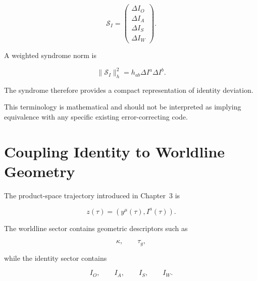 \documentclass[12pt,oneside]{book}
\begin{document}
\begin{equation}
    \mathcal{S}_I
    =
    \begin{pmatrix}
        \Delta I_O \\
        \Delta I_A \\
        \Delta I_S \\
        \Delta I_W
    \end{pmatrix}.
    \label{eq:identity-syndrome-vector}
\end{equation}

A weighted syndrome norm is

\begin{equation}
    \|\mathcal{S}_I\|_h^2
    =
    h_{ab}
    \Delta I^a
    \Delta I^b.
    \label{eq:identity-syndrome-norm}
\end{equation}

The syndrome therefore provides a compact representation of
identity deviation.

This terminology is mathematical and should not be interpreted
as implying equivalence with any specific existing
error-correcting code.


\section{Coupling Identity to Worldline Geometry}
\label{sec:identity-worldline-coupling}

The product-space trajectory introduced in Chapter~3 is

\begin{equation}
    z(\tau)
    =
    \left(
        y^\mu(\tau),
        I^a(\tau)
    \right).
    \label{eq:chapter-four-product-trajectory}
\end{equation}

The worldline sector contains geometric descriptors such as

\begin{equation}
    \kappa,
    \qquad
    \tau_g,
\end{equation}

while the identity sector contains

\begin{equation}
    I_O,
    \qquad
    I_A,
    \qquad
    I_S,
    \qquad
    I_W.
\end{equation}
\end{document}
